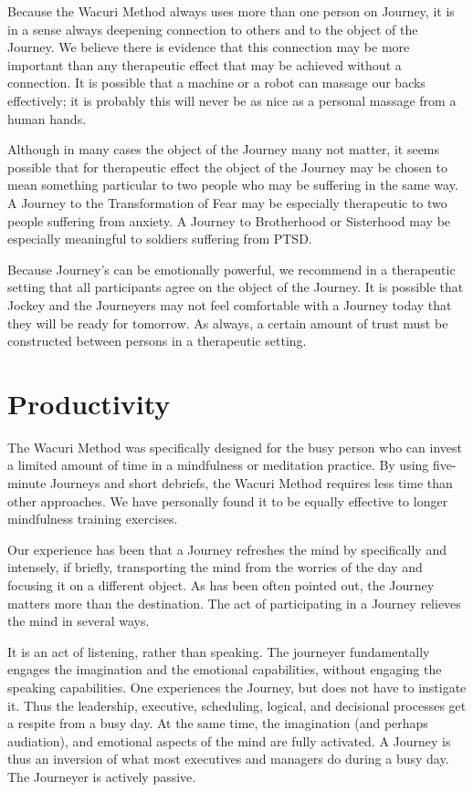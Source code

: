 \documentclass[12pt]{book}
\begin{document}
Because the Wacuri Method always uses more than one person on Journey,
it is in a sense always deepening connection to others and to the
object of the Journey. We believe there is evidence that this
connection may be more important than any therapeutic effect that may
be achieved without a connection. It is possible that a machine or a
robot can massage our backs effectively; it is probably this will
never be as nice as a personal massage from a human hands.

Although in many cases the object of the Journey many not matter, it
seems possible that for therapeutic effect the object of the Journey
may be chosen to mean something particular to two people who may be
suffering in the same way. A Journey to the Transformation of Fear may
be especially therapeutic to two people suffering from anxiety. A
Journey to Brotherhood or Sisterhood may be especially meaningful to
soldiers suffering from PTSD.

Because Journey's can be emotionally powerful, we recommend in a
therapeutic setting that all participants agree on the object of the
Journey. It is possible that Jockey and the Journeyers may not feel
comfortable with a Journey today that they will be ready for
tomorrow. As always, a certain amount of trust must be constructed
between persons in a therapeutic setting.

\section{Productivity}

The Wacuri Method was specifically designed for the busy person who
can invest a limited amount of time in a mindfulness or meditation
practice. By using five-minute Journeys and short debriefs, the Wacuri
Method requires less time than other approaches. We have personally
found it to be equally effective to longer mindfulness training
exercises.

Our experience has been that a Journey refreshes the mind by
specifically and intensely, if briefly, transporting the mind from the
worries of the day and focusing it on a different object. As has been
often pointed out, the Journey matters more than the destination. The
act of participating in a Journey relieves the mind in several ways.

It is an act of listening, rather than speaking. The journeyer
fundamentally engages the imagination and the emotional capabilities,
without engaging the speaking capabilities. One experiences the
Journey, but does not have to instigate it.  Thus the leadership,
executive, scheduling, logical, and decisional processes get a respite
from a busy day. At the same time, the imagination (and perhaps
audiation), and emotional aspects of the mind are fully activated. A
Journey is thus an inversion of what most executives and managers do
during a busy day. The Journeyer is actively passive.
\end{document}
